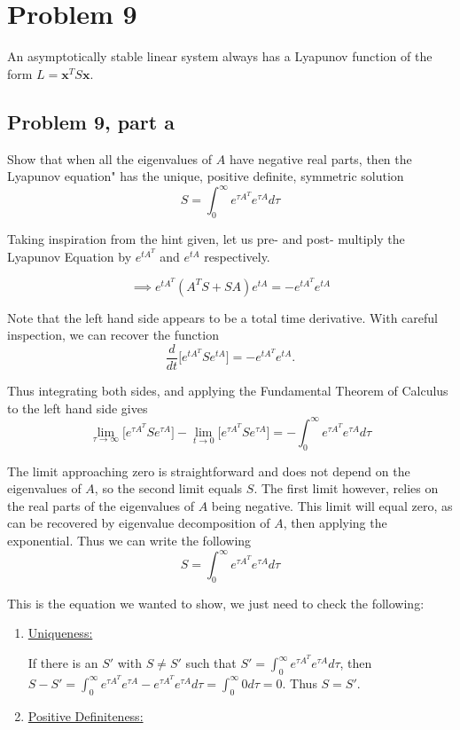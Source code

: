 \newpage
\section{Problem 9}
An asymptotically stable linear system always has a Lyapunov function of the form $L = \textbf{x}^TS\textbf{x}.$

\subsection{Problem 9, part a}
Show that when all the eigenvalues of $A$ have negative real parts, then the        Lyapunov equation" has the unique, positive definite, symmetric solution
\[
S = \int_0^\infty e^{\tau A^T}e^{\tau A}d\tau
\]
\partbreak
\begin{solution}

    Taking inspiration from the hint given, let us pre- and post- multiply the Lyapunov Equation by $e^{tA^T}$ and $e^{tA}$ respectively. 

    \[
    \implies e^{tA^T}(A^TS + SA)e^{tA} = -e^{tA^T}e^{tA}
    \]

    Note that the left hand side appears to be a total time derivative. With careful inspection, we can recover the function
    \[
    \frac{d}{dt}\Big[ e^{tA^T}Se^{tA} \Big] = -e^{tA^T}e^{tA}.
    \]

    Thus integrating both sides, and applying the Fundamental Theorem of Calculus to the left hand side gives
    \[
    \lim_{\tau \rightarrow \infty} \Big[ e^{\tau A^T}Se^{\tau A}\Big] - \lim_{t \rightarrow 0} \Big[ e^{\tau A^T}Se^{\tau A}\Big] = -\int_0^\infty e^{\tau A^T}e^{\tau A} d\tau
    \]

    The limit approaching zero is straightforward and does not depend on the eigenvalues of $A$, so the second limit equals $S$. The first limit however, relies on the real parts of the eigenvalues of $A$ being negative. This limit will equal zero, as can be recovered by eigenvalue decomposition of $A$, then applying the exponential. Thus we can write the following
    \[
    S = \int_0^\infty e^{\tau A^T}e^{\tau A} d\tau
    \]

    This is the equation we wanted to show, we just need to check the following:
    \begin{enumerate}
        \item \underline{Uniqueness:}

        If there is an $S'$ with $S \neq S'$ such that $S' = \int_0^\infty e^{\tau A^T}e^{\tau A} d\tau$, then $S - S' = \int_0^\infty e^{\tau A^T}e^{\tau A} - e^{\tau A^T}e^{\tau A} d\tau = \int_0^\infty 0 d\tau = 0$. Thus $S = S'$.
        \item \underline{Positive Definiteness:}


\end{enumerate}
\end{solution}
